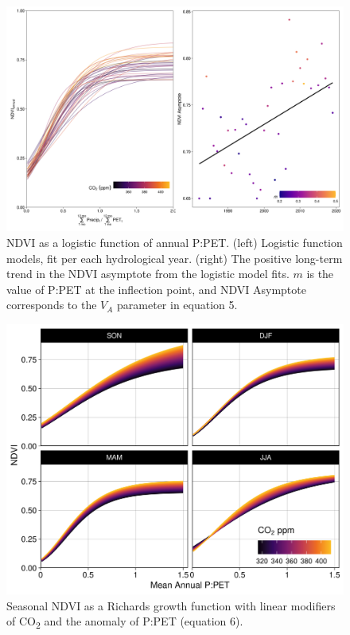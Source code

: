 \documentclass[gc, manuscript]{copernicus}
\begin{document}
\clearpage
\begin{figure}
\includegraphics[width=14cm]{../../figures/appendix-A/SM_Fig5_ndvi3mo_PE12mo_logistic_Asym_xmid} \caption{NDVI as a logistic function of annual P:PET. (left) Logistic function models, fit per each hydrological year. (right) The positive long-term trend in the NDVI asymptote from the logistic model fits. $m$ is the value of P:PET at the inflection point, and NDVI Asymptote corresponds to the $V_A$ parameter in equation 5.}\label{fig:FigA5}
\end{figure}
\clearpage

\clearpage
\begin{figure}
\includegraphics[width=14cm]{../../figures/appendix-A/SM_Fig6_ndvi3mo_PE12mo_richard_x3_nlsFit_bySeason} \caption{Seasonal NDVI as a Richards growth function with linear modifiers of CO\textsubscript{2} and the anomaly of P:PET (equation 6). }\label{fig:FigA6}
\end{figure}
\clearpage
\end{document}
